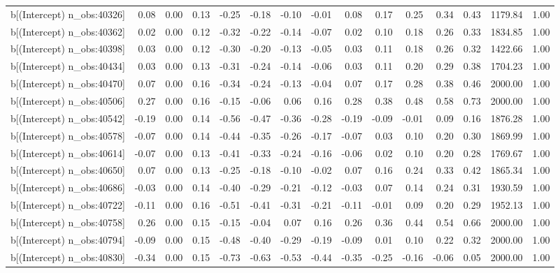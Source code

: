 \begin{table}[ht]
\begin{tabular}{rrrrrrrrrrrrrrr}
  b[(Intercept) n\_obs:40326] & 0.08 & 0.00 & 0.13 & -0.25 & -0.18 & -0.10 & -0.01 & 0.08 & 0.17 & 0.25 & 0.34 & 0.43 & 1179.84 & 1.00 \\ 
  b[(Intercept) n\_obs:40362] & 0.02 & 0.00 & 0.12 & -0.32 & -0.22 & -0.14 & -0.07 & 0.02 & 0.10 & 0.18 & 0.26 & 0.33 & 1834.85 & 1.00 \\ 
  b[(Intercept) n\_obs:40398] & 0.03 & 0.00 & 0.12 & -0.30 & -0.20 & -0.13 & -0.05 & 0.03 & 0.11 & 0.18 & 0.26 & 0.32 & 1422.66 & 1.00 \\ 
  b[(Intercept) n\_obs:40434] & 0.03 & 0.00 & 0.13 & -0.31 & -0.24 & -0.14 & -0.06 & 0.03 & 0.11 & 0.20 & 0.29 & 0.38 & 1704.23 & 1.00 \\ 
  b[(Intercept) n\_obs:40470] & 0.07 & 0.00 & 0.16 & -0.34 & -0.24 & -0.13 & -0.04 & 0.07 & 0.17 & 0.28 & 0.38 & 0.46 & 2000.00 & 1.00 \\ 
  b[(Intercept) n\_obs:40506] & 0.27 & 0.00 & 0.16 & -0.15 & -0.06 & 0.06 & 0.16 & 0.28 & 0.38 & 0.48 & 0.58 & 0.73 & 2000.00 & 1.00 \\ 
  b[(Intercept) n\_obs:40542] & -0.19 & 0.00 & 0.14 & -0.56 & -0.47 & -0.36 & -0.28 & -0.19 & -0.09 & -0.01 & 0.09 & 0.16 & 1876.28 & 1.00 \\ 
  b[(Intercept) n\_obs:40578] & -0.07 & 0.00 & 0.14 & -0.44 & -0.35 & -0.26 & -0.17 & -0.07 & 0.03 & 0.10 & 0.20 & 0.30 & 1869.99 & 1.00 \\ 
  b[(Intercept) n\_obs:40614] & -0.07 & 0.00 & 0.13 & -0.41 & -0.33 & -0.24 & -0.16 & -0.06 & 0.02 & 0.10 & 0.20 & 0.28 & 1769.67 & 1.00 \\ 
  b[(Intercept) n\_obs:40650] & 0.07 & 0.00 & 0.13 & -0.25 & -0.18 & -0.10 & -0.02 & 0.07 & 0.16 & 0.24 & 0.33 & 0.42 & 1865.34 & 1.00 \\ 
  b[(Intercept) n\_obs:40686] & -0.03 & 0.00 & 0.14 & -0.40 & -0.29 & -0.21 & -0.12 & -0.03 & 0.07 & 0.14 & 0.24 & 0.31 & 1930.59 & 1.00 \\ 
  b[(Intercept) n\_obs:40722] & -0.11 & 0.00 & 0.16 & -0.51 & -0.41 & -0.31 & -0.21 & -0.11 & -0.01 & 0.09 & 0.20 & 0.29 & 1952.13 & 1.00 \\ 
  b[(Intercept) n\_obs:40758] & 0.26 & 0.00 & 0.15 & -0.15 & -0.04 & 0.07 & 0.16 & 0.26 & 0.36 & 0.44 & 0.54 & 0.66 & 2000.00 & 1.00 \\ 
  b[(Intercept) n\_obs:40794] & -0.09 & 0.00 & 0.15 & -0.48 & -0.40 & -0.29 & -0.19 & -0.09 & 0.01 & 0.10 & 0.22 & 0.32 & 2000.00 & 1.00 \\ 
  b[(Intercept) n\_obs:40830] & -0.34 & 0.00 & 0.15 & -0.73 & -0.63 & -0.53 & -0.44 & -0.35 & -0.25 & -0.16 & -0.06 & 0.05 & 2000.00 & 1.00 \\ 

\end{tabular}
\end{table}
